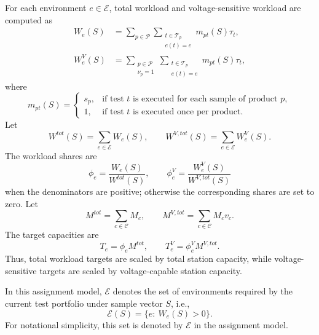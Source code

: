 \documentclass[11pt]{article}
\begin{document}
For each environment \(e\in\mathcal{E}\), total workload and voltage-sensitive workload are computed as
\begin{align}
W_e(S) &=
\sum_{p\in\mathcal{P}}
\sum_{\substack{t\in\mathcal{T}_p\\e(t)=e}}
m_{pt}(S)\tau_t,
\\
W_e^V(S) &=
\sum_{\substack{p\in\mathcal{P}\\ \nu_p=1}}
\sum_{\substack{t\in\mathcal{T}_p\\e(t)=e}}
m_{pt}(S)\tau_t,
\end{align}
where
\begin{equation}
m_{pt}(S)=
\left\{
\begin{array}{ll}
s_p, & \text{if test } t \text{ is executed for each sample of product } p,\\
1, & \text{if test } t \text{ is executed once per product.}
\end{array}
\right.
\end{equation}
Let
\[
W^{tot}(S)=\sum_{e\in\mathcal{E}}W_e(S),
\qquad
W^{V,tot}(S)=\sum_{e\in\mathcal{E}}W_e^V(S).
\]
The workload shares are
\[
\phi_e=\frac{W_e(S)}{W^{tot}(S)},\qquad
\phi_e^V=\frac{W_e^V(S)}{W^{V,tot}(S)}
\]
when the denominators are positive; otherwise the corresponding shares are set to zero. Let
\[
M^{tot}=\sum_{c\in\mathcal{C}}M_c,
\qquad
M^{V,tot}=\sum_{c\in\mathcal{C}}M_cv_c.
\]
The target capacities are
\[
T_e=\phi_e M^{tot},\qquad
T_e^V=\phi_e^V M^{V,tot}.
\]
Thus, total workload targets are scaled by total station capacity, while voltage-sensitive targets are scaled by voltage-capable station capacity.

In this assignment model, \(\mathcal{E}\) denotes the set of environments required by the current test portfolio under sample vector \(S\), i.e.,
\[
\mathcal{E}(S)=\{e:\ W_e(S)>0\}.
\]
For notational simplicity, this set is denoted by \(\mathcal{E}\) in the assignment model.
\end{document}
